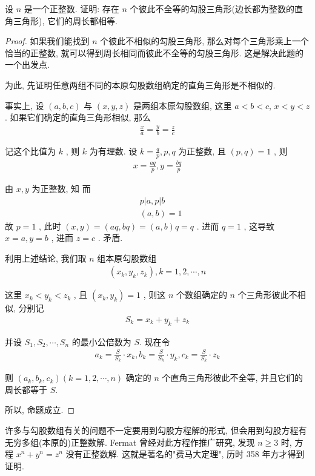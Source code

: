 \begin{example}
	设 $n$ 是一个正整数. 证明: 存在 $n$ 个彼此不全等的勾股三角形(边长都为整数的直角三角形), 它们的周长都相等.
\end{example}
\begin{proof}
	如果我们能找到 $n$ 个彼此不相似的勾股三角形, 那么对每个三角形乘上一个恰当的正整数, 就可以得到周长相同而彼此不全等的勾股三角形. 这是解决此题的一个出发点.

	为此, 先证明任意两组不同的本原勾股数组确定的直角三角形是不相似的.

	事实上, 设 $(a, b, c)$ 与 $(x, y, z)$ 是两组本原勾股数组, 这里 $a<b<c$, $x<y<z$ . 如果它们确定的直角三角形相似, 那么
	\begin{align*}
		\frac{x}{a}=\frac{y}{b}=\frac{z}{c}
	\end{align*}

	记这个比值为 $k$ , 则 $k$ 为有理数. 设 $k=\frac{q}{p}, p ,  q$ 为正整数, 且 $(p, q)=1$ , 则
	\begin{align*}
		x=\frac{a q}{p}, y=\frac{b q}{p}
	\end{align*}

	由 $x ,  y$ 为正整数, 知
	而\begin{align}
		 & p|a, p| b \\
		 & (a, b)=1
	\end{align}
	故 $p=1$ , 此时 $(x, y)=(a q, b q)=(a, b) q=q$ . 进而 $q=1$ , 这导致 $x=a, y=b$ , 进而 $z=c$ . 矛盾.

	利用上述结论, 我们取 $n$ 组本原勾股数组
	\begin{align*}
		\left(x_{k}, y_{k}, z_{k}\right), k=1,2, \cdots, n
	\end{align*}

	这里 $x_{k}<y_{k}<z_{k}$ , 且 $\left(x_{k}, y_{k}\right)=1$ , 则这 $n$ 个数组确定的 $n$ 个三角形彼此不相似, 分别记
	\begin{align*}
		S_{k}=x_{k}+y_{k}+z_{k}
	\end{align*}

	并设 $S_{1}, S_{2}, \cdots, S_{n}$ 的最小公倍数为 $S$. 现在令
	\begin{align*}
		a_{k}=\frac{S}{S_{k}} \cdot x_{k}, b_{k}=\frac{S}{S_{k}} \cdot y_{k}, c_{k}=\frac{S}{S_{k}} \cdot z_{k}
	\end{align*}

	则 $\left(a_{k}, b_{k}, c_{k}\right)(k=1,2, \cdots, n)$ 确定的 $n$ 个直角三角形彼此不全等, 并且它们的周长都等于 $S$.

	所以, 命题成立.
\end{proof}
\begin{note}
	许多与勾股数组有关的问题不一定要用到勾股方程解的形式, 但会用到勾股方程有无穷多组(本原的)正整数解.  Fermat 曾经对此方程作推广研究, 发现 $n \geqslant 3$ 时, 方程 $x^{n}+y^{n}=z^{n}$ 没有正整数解. 这就是著名的"费马大定理", 历时 358 年方才得到证明.
\end{note}

